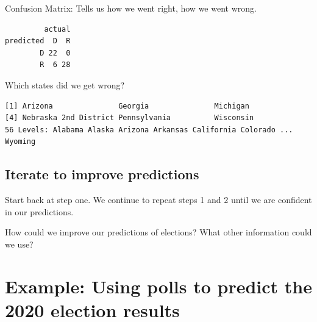 \documentclass[
  letterpaper,
  DIV=11,
  numbers=noendperiod]{scrreprt}
\newenvironment{Shaded}{\begin{snugshade}}{\end{snugshade}}
\newcommand{\AttributeTok}[1]{\textcolor[rgb]{0.40,0.45,0.13}{#1}}
\newcommand{\FunctionTok}[1]{\textcolor[rgb]{0.28,0.35,0.67}{#1}}
\newcommand{\NormalTok}[1]{\textcolor[rgb]{0.00,0.23,0.31}{#1}}
\newcommand{\SpecialCharTok}[1]{\textcolor[rgb]{0.37,0.37,0.37}{#1}}
\begin{document}
Confusion Matrix: Tells us how we went right, how we went wrong.

\begin{Shaded}
\end{Shaded}

\begin{verbatim}
         actual
predicted  D  R
        D 22  0
        R  6 28
\end{verbatim}

Which states did we get wrong?

\begin{Shaded}
\end{Shaded}

\begin{verbatim}
[1] Arizona               Georgia               Michigan             
[4] Nebraska 2nd District Pennsylvania          Wisconsin            
56 Levels: Alabama Alaska Arizona Arkansas California Colorado ... Wyoming
\end{verbatim}

\hypertarget{iterate-to-improve-predictions}{%
\subsection{Iterate to improve
predictions}\label{iterate-to-improve-predictions}}

Start back at step one. We continue to repeat steps 1 and 2 until we are
confident in our predictions.

How could we improve our predictions of elections? What other
information could we use?

\hypertarget{example-using-polls-to-predict-the-2020-election-results}{%
\section{Example: Using polls to predict the 2020 election
results}\label{example-using-polls-to-predict-the-2020-election-results}}
\end{document}
